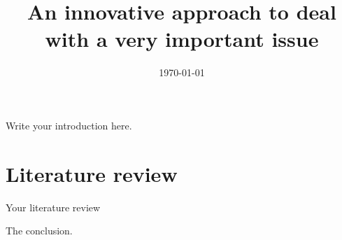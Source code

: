 \documentclass{gsemthesis}
\title{An innovative approach to deal with a very important issue}
\date{\today}
\begin{document}
\printcoverpage

\printfrontmatter

\startintroduction 

Write your introduction here.

\chapter{Literature review}
\label{ch:lt}

Your literature review

\startconclusion

The conclusion.

\listoftables
\listoffigures

\newpage
\printbibliography
\end{document}
